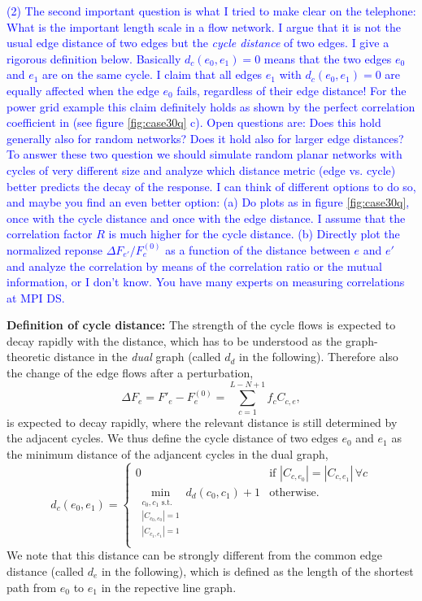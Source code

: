 \documentclass[10pt,aps,pra,twocolumn,superscriptaddress]{revtex4-1}
\newcommand{\dirk}[1]{\textcolor{blue}{#1}}
\newcommand{\be}{\begin{equation}}
\newcommand{\ee}{\end{equation}}
\begin{document}
\dirk{
(2) The second important question is what I tried to make clear on the telephone: What
is the important length scale in a flow network. I argue that it is not the usual edge 
distance of two edges but the \emph{cycle distance} of two edges. I give a rigorous 
definition below. Basically $d_c(e_0,e_1) = 0$ means that the two edges $e_0$ and $e_1$ 
are on the same cycle. I claim that all edges  $e_1$ with $d_c(e_0,e_1) = 0$ are equally 
affected when the edge $e_0$ fails, regardless of their edge distance! For the power grid 
example this claim definitely holds as shown by the perfect correlation coefficient in
(see figure \ref{fig:case30q} c). Open questions are: Does this hold generally also for 
random networks? Does it hold also for larger edge distances? To answer these two question 
we should simulate random planar networks with cycles of very different size and analyze 
which distance metric (edge vs. cycle) better predicts the decay of the response. I can think 
of different options to do so, and maybe you find an even better option:
(a) Do plots as in figure \ref{fig:case30q}, once with the cycle distance and once with
the edge distance. I assume that the correlation factor $R$ is much  higher for the cycle 
distance.  
(b) Directly plot the normalized reponse $\Delta F_{e'}/F^{(0)}_e$ as a function of the
distance between $e$ and $e'$ and analyze the correlation by means of the correlation 
ratio or the mutual information, or I don't know. You have many experts on measuring 
correlations at MPI DS.
}


\textbf{Definition of cycle distance:}
The strength of the cycle flows is expected to decay rapidly with the distance, which has to be 
understood as the graph-theoretic distance in the \emph{dual} graph (called $d_d$ in the following).
Therefore also the change of the edge flows after a perturbation,
\be
   \Delta F_e = F'_e  - F_e^{(0)} = \sum_{c=1}^{L-N+1} f_c C_{c,e},
\ee
is expected to decay rapidly, where the relevant distance is still determined by the adjacent 
cycles. We thus define the cycle distance of two edges $e_0$ and $e_1$ as the minimum distance 
of the adjancent cycles in the dual graph, 
\be
  d_c(e_0,e_1) = 
  \begin{cases}
      0 & \text{if } |C_{c,e_0}| = |C_{c,e_1}| \,  \forall c \\
      \min \limits_{\substack{c_0,c_1 \text{ s.t.} \\  |C_{c_0,e_0}| = 1 \\  |C_{c_1,e_1}| = 1}} 
          d_d(c_0,c_1) +1
      & \text{otherwise.} \\
  \end{cases}
  \label{def:cycledist}
\ee
We note that this distance can be strongly different from the common edge distance
(called $d_e$ in the following), which is defined as the length of the shortest path from
$e_0$ to $e_1$ in the repective line graph.
\end{document}
